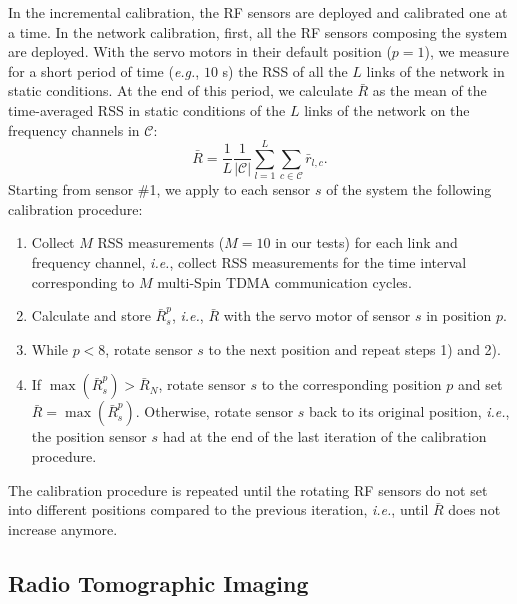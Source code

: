 \documentclass[conference]{IEEEtran}
\begin{document}
In the incremental calibration, the RF sensors are deployed and calibrated one at a time. In the network calibration, first, all the RF sensors composing the system are deployed. With the servo motors in their default position ($p=1$),  we measure for a short period of time (\emph{e.g.}, $10$ s) the RSS of all the $L$ links of the network in static conditions. At the end of this period, we calculate $\bar{R}$ as the mean of the time-averaged RSS in static conditions of the $L$ links of the network on the frequency channels in $\mathcal{C}$:
    \begin{equation} \label{eq:mean_RSS_network}
        \bar{R}= \frac{1}{L} \frac{1}{|\mathcal{C}|}  \sum_{l=1}^L \sum_{c \in \mathcal{C}} \bar{r}_{l,c}.
    \end{equation}
Starting from sensor \#1, we apply to each sensor $s$ of the system the following calibration procedure:
\begin{enumerate}
    \item Collect $M$ RSS measurements ($M = 10$ in our tests) for each link and frequency channel, \emph{i.e.}, collect RSS measurements for the time interval corresponding to $M$ multi-Spin TDMA communication cycles.
    \item Calculate and store $\bar{R}_s^p$, \emph{i.e.}, $\bar{R}$ with the servo motor of sensor $s$ in position $p$.
\item While $p < 8$, rotate sensor $s$ to the next position and repeat steps 1) and 2).
    \item If $\max{(\bar{R}_s^p)} > \bar{R}_N$, rotate sensor $s$ to the corresponding position $p$ and set $\bar{R} = \max{(\bar{R}_s^p)}$. Otherwise, rotate sensor $s$ back to its original position, \emph{i.e.}, the position sensor $s$ had at the end of the last iteration of the calibration procedure.
\end{enumerate}
The calibration procedure is repeated until the rotating RF sensors do not set into different positions compared to the previous iteration, \emph{i.e.}, until $\bar{R}$ does not increase anymore.



\subsection{Radio Tomographic Imaging}
\label{sec:RTI}
\end{document}
